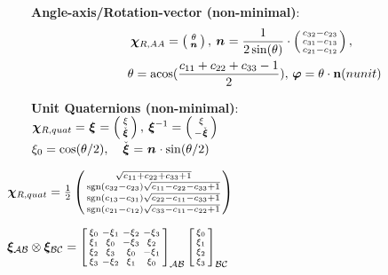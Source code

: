 \documentclass[a4paper, 8pt]{extarticle}
\newcommand{\mvec}[3]{  \prescript{}{\mathcal{#1}}{\bm{#2}}  _{#3} }
\newcommand{\mquat}[1]{ \bm{\xi}_{ \mathcal{#1} } }
\DeclareMathOperator{\cosinv}{acos}
\DeclareMathOperator{\sgn}{sgn}
\begin{document}
\begin{multicols*}{3}
\noindent\textbf{Angle-axis/Rotation-vector (non-minimal)}:\\
\vspace{-2em}
\begin{multline*}
\mkern-36mu
\mvec{}{\chi}{R,AA} = \left(\begin{smallmatrix}
\theta\\
\mvec{}{n}{}
\end{smallmatrix}\right),\,
\mvec{}{n}{} = \frac{1}{2\sin(\theta)}\cdot
\left(\begin{smallmatrix}
c_{32} - c_{23}\\
c_{31} - c_{13}\\
c_{21} - c_{12}
\end{smallmatrix}\right),\, \\
\theta = \cosinv(\frac{c_{11} + c_{22} + c_{33} - 1}{2}),\, \bm \varphi = \theta\cdot\textbf n (n unit)
\end{multline*}

\noindent\textbf{Unit Quaternions (non-minimal)}:\\
$\mvec{}{\chi}{R,quat} = \mvec{}{\xi}{} = \left(\begin{smallmatrix}
\xi \\
 \check{\mvec{}{\xi}{}}
\end{smallmatrix}\right),\,
 \mvec{}{\xi}{}^{-1} = \left(\begin{smallmatrix}
\xi \\
-\check{\mvec{}{\xi}{}}
\end{smallmatrix}\right)$\\
$\xi_0 = \cos(\theta/2),\quad \check{\mvec{}{\xi}{}} = \mvec{}{n}{}\cdot\sin(\theta/2)$

$\mkern-36mu
\mvec{}{\chi}{R,quat} = \frac{1}{2} 
\left(\begin{smallmatrix}
\sqrt{c_{11} + c_{22} + c_{33} + 1}\\
\sgn(c_{32} - c_{23})\sqrt{c_{11} - c_{22} - c_{33} + 1}\\
\sgn(c_{13} - c_{31})\sqrt{c_{22} - c_{11} - c_{33} + 1}\\
\sgn(c_{21} - c_{12})\sqrt{c_{33} - c_{11} - c_{22} + 1}
\end{smallmatrix}\right)$

$\mkern-36mu
\mquat{AB} \otimes \mquat{BC} = \left[\begin{smallmatrix}
\xi_0  & -\xi_1  & -\xi_2  & -\xi_3 \\
\xi_1  &  \xi_0  & -\xi_3  &  \xi_2 \\
\xi_2  &  \xi_3  &  \xi_0  & -\xi_1 \\
\xi_3  & -\xi_2  &  \xi_1  &  \xi_0
\end{smallmatrix}\right]_{\mathcal{AB}}  \left[\begin{smallmatrix}
\xi_0 \\  \xi_1 \\  \xi_2 \\  \xi_3
\end{smallmatrix}\right]_{\mathcal{BC}}$


\end{multicols*}
\end{document}
